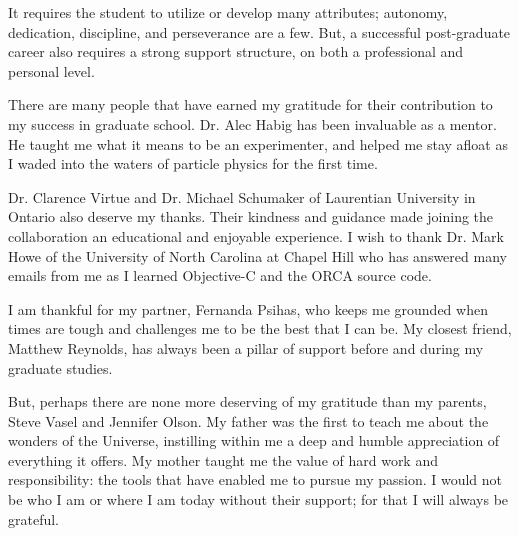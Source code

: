 %
%
%
%



 It requires the student to utilize or develop many attributes; autonomy, dedication, discipline, and perseverance are a few. But, a successful post-graduate career also requires a strong support structure, on both a professional and personal level. 

There are many people that have earned my gratitude for their contribution to my success in graduate school. Dr. Alec Habig has been invaluable as a mentor. He taught me what it means to be an experimenter, and helped me stay afloat as I waded into the waters of particle physics for the first time.

Dr. Clarence Virtue and Dr. Michael Schumaker of Laurentian University in Ontario also deserve my thanks. Their kindness and guidance made joining the collaboration an educational and enjoyable experience. I wish to thank Dr. Mark Howe of the University of North Carolina at Chapel Hill who has answered many emails from me as I learned Objective-C and the ORCA source code.

I am thankful for my partner, Fernanda Psihas, who keeps me grounded when times are tough and challenges me to be the best that I can be. My closest friend, Matthew Reynolds, has always been a pillar of support before and during my graduate studies.

But, perhaps there are none more deserving of my gratitude than my parents, Steve Vasel and Jennifer Olson. My father was the first to teach me about the wonders of the Universe, instilling within me a deep and humble appreciation of everything it offers. My mother taught me the value of hard work and responsibility: the tools that have enabled me to pursue my passion. I would not be who I am or where I am today without their support; for that I will always be grateful.


